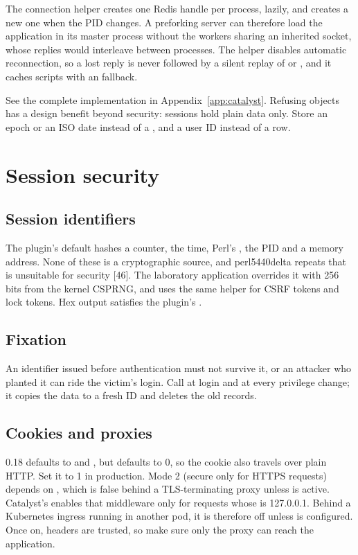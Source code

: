 The connection helper creates one Redis handle per process, lazily, and creates a new one when the PID changes. A preforking server can therefore load the application in its master process without the workers sharing an inherited socket, whose replies would interleave between processes. The helper disables automatic reconnection, so a lost reply is never followed by a silent replay of  or , and it caches scripts with an  fallback.

See the complete implementation in Appendix~\ref{app:catalyst}.
Refusing objects has a design benefit beyond security: sessions hold plain data only. Store an epoch or an ISO date instead of a , and a user ID instead of a  row.

\section{Session security}
\subsection*{Session identifiers}
The plugin's default  hashes a counter, the time, Perl's , the PID and a memory address. None of these is a cryptographic source, and perl5440delta repeats that  is unsuitable for security [46]. The laboratory application overrides it with 256 bits from the kernel CSPRNG, and uses the same  helper for CSRF tokens and lock tokens. Hex output satisfies the plugin's .

\subsection*{Fixation}
An identifier issued before authentication must not survive it, or an attacker who planted it can ride the victim's login. Call  at login and at every privilege change; it copies the data to a fresh ID and deletes the old records.

\subsection*{Cookies and proxies}
 0.18 defaults to  and , but  defaults to 0, so the cookie also travels over plain HTTP. Set it to 1 in production. Mode 2 (secure only for HTTPS requests) depends on , which is false behind a TLS-terminating proxy unless  is active. Catalyst's  enables that middleware only for requests whose  is 127.0.0.1. Behind a Kubernetes ingress running in another pod, it is therefore off unless  is configured. Once on,  headers are trusted, so make sure only the proxy can reach the application.

